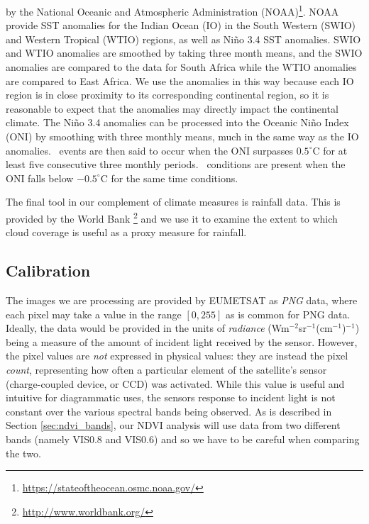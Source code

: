 by the National Oceanic and Atmospheric Administration
(NOAA)\footnote{\url{https://stateoftheocean.osmc.noaa.gov/}}. NOAA
provide SST anomalies for the Indian Ocean (IO) in the South Western
(SWIO) and Western Tropical (WTIO) regions, as well as Ni{\~n}o 3.4
SST anomalies. SWIO and WTIO anomalies are smoothed by taking three
month means, and the SWIO anomalies are compared to the data for South
Africa while the WTIO anomalies are compared to East Africa. We use
the anomalies in this way because each IO region is in close proximity
to its corresponding continental region, so it is reasonable to expect
that the anomalies may directly impact the continental climate. The
Ni{\~n}o 3.4 anomalies can be processed into the Oceanic Ni{\~n}o
Index (ONI) by smoothing with three monthly means, much in the same
way as the IO anomalies. \elnino\ events are then said to occur when
the ONI surpasses $0.5^{\circ}$C for at least five consecutive three
monthly periods. \nina\
conditions are present when the ONI falls
below $-0.5^{\circ}$C for the same time conditions.

The final tool in our complement of climate measures is rainfall
data. This is provided by the World
Bank \footnote{\url{http://www.worldbank.org/}} and we use it to
examine the extent to which cloud coverage is useful as a proxy
measure for rainfall.

\subsection{Calibration}
\label{sec:data:calib}

The images we are processing are provided by EUMETSAT as \emph{PNG} data, where
each pixel may take a value in the range $\left[0, 255\right]$ as is common for
PNG data. Ideally, the data would be provided in the units of \emph{radiance}
(Wm$^{-2}$sr$^{-1}$(cm$^{-1}$)$^{-1}$) being a measure of the amount of incident
light received by the sensor. However, the pixel values are \emph{not} expressed
in physical values: they are instead the pixel \emph{count}, representing how
often a particular element of the satellite's sensor (charge-coupled device, or
CCD) was activated. While this value is useful and intuitive for diagrammatic
uses, the sensors response to incident light is not constant over the various
spectral bands being observed. As is described in Section \ref{sec:ndvi_bands},
our NDVI analysis will use data from two different bands (namely VIS0.8 and
VIS0.6) and so we have to be careful when comparing the two.

